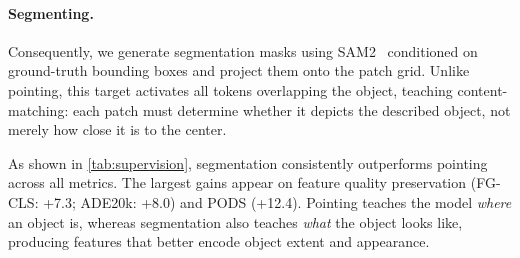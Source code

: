\paragraph{Segmenting.}
Consequently, we generate segmentation masks using SAM2~\cite{ravi2024sam2} conditioned on ground-truth bounding boxes and project them onto the patch grid.
Unlike pointing, this target activates all tokens overlapping the object, teaching content-matching: each patch must determine whether it depicts the described object, not merely how close it is to the center.



As shown in \cref{tab:supervision}, segmentation consistently outperforms pointing across all metrics.
The largest gains appear on feature quality preservation (FG-CLS: +7.3; ADE20k: +8.0) and PODS (+12.4). Pointing teaches the model \textit{where} an object is, whereas segmentation also teaches \textit{what} the object looks like, producing features that better encode object extent and appearance.


